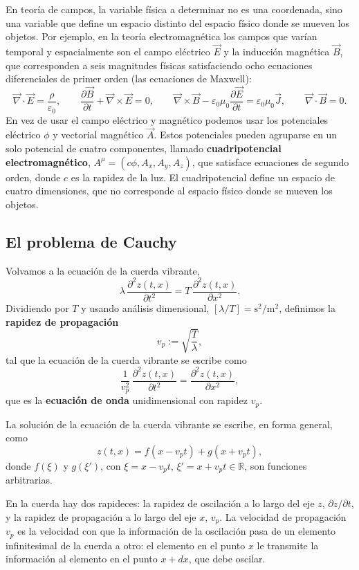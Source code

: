 En teoría de campos, la variable física a determinar no es una
coordenada, sino una variable que define un espacio distinto del espacio
físico donde se mueven los objetos. Por ejemplo, en la teoría
electromagnética los campos que varían temporal y espacialmente son el
campo eléctrico $\vec E$ y la inducción magnética $\vec B$, que
corresponden a seis magnitudes físicas satisfaciendo ocho ecuaciones
diferenciales de primer orden (las ecuaciones de Maxwell):
\[
\vec\nabla\cdot\vec E = \frac{\rho}{\varepsilon_0}, \qquad
\frac{\partial\vec B}{\partial t} + \vec\nabla\times\vec E = 0, \qquad
\vec\nabla\times\vec B - \varepsilon_0\mu_0\frac{\partial\vec
E}{\partial t} = \varepsilon_0\mu_0\vec J, \qquad \vec\nabla\cdot\vec B
= 0.
\]
En vez de usar el campo eléctrico y magnético podemos usar los
potenciales eléctrico $\phi$ y vectorial magnético $\vec A$. Estos
potenciales pueden agruparse en un solo potencial de cuatro componentes,
llamado \textbf{cuadripotencial electromagnético}, $A^\mu = (c\phi,
A_x,A_y,A_z)$, que satisface ecuaciones de segundo orden, donde $c$ es la
rapidez de la luz. El cuadripotencial define un espacio de cuatro
dimensiones, que no corresponde al espacio físico donde se mueven los
objetos.

\subsection{El problema de Cauchy}

Volvamos a la ecuación de la cuerda vibrante,
\[
\lambda\, \frac{\partial^2 z(t,x)}{\partial t^2} = T\,\frac{\partial^2
z(t,x)}{\partial x^2}.
\]
Dividiendo por $T$ y usando análisis dimensional, $[\lambda/T] =
\text{s}^2/\text{m}^2$, definimos la \textbf{rapidez de propagación}
\[
v_p := \sqrt{\frac{T}{\lambda}},
\]
tal que la ecuación de la cuerda vibrante se escribe como
\[
\frac{1}{v_p^2}\, \frac{\partial^2 z(t,x)}{\partial t^2} =
\frac{\partial^2 z(t,x)}{\partial x^2},
\]
que es la \textbf{ecuación de onda} unidimensional con rapidez $v_p$.

\begin{proposicionc}
La solución de la ecuación de la cuerda vibrante se escribe, en forma
general, como
\[
z(t,x) = f(x-v_pt) + g(x+v_pt),
\]
donde $f(\xi)$ y $g(\xi')$, con $\xi=x-v_pt$, $\xi'=x+v_pt \in
\mathbb{R}$, son funciones arbitrarias.
\end{proposicionc}

\begin{observacion}
En la cuerda hay dos rapideces: la rapidez de oscilación a lo largo del
eje $z$, $\partial z/\partial t$, y la rapidez de propagación a lo largo
del eje $x$, $v_p$. La velocidad de propagación $v_p$ es la velocidad con
que la información de la oscilación pasa de un elemento infinitesimal de
la cuerda a otro: el elemento en el punto $x$ le transmite la
información al elemento en el punto $x+dx$, que debe oscilar.
\end{observacion}

